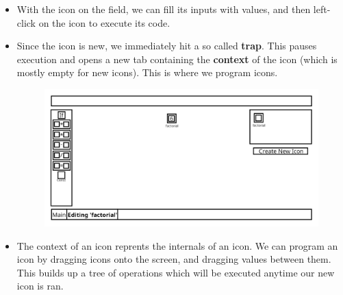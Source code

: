 \documentclass{article}
\begin{document}
\begin{itemize}
            \item
                With the icon on the field, we can fill its inputs with values, and then left-click on the icon to execute its
                code.

            \item
                Since the icon is new, we immediately hit a so called \textbf{trap}. This pauses execution and opens a new tab
                containing the \textbf{context} of the icon (which is mostly empty for new icons). This is where we program
                icons.
                \begin{figure}[H]
                    \includegraphics[width=\textwidth]{include/example_factorial_new_tab.png}
                    \centering
                \end{figure}

            \item
                The context of an icon reprents the internals of an icon. We can program an icon by dragging icons onto the
                screen, and dragging values between them. This builds up a tree of operations which will be executed anytime
                our new icon is ran.


\end{itemize}
\end{document}
